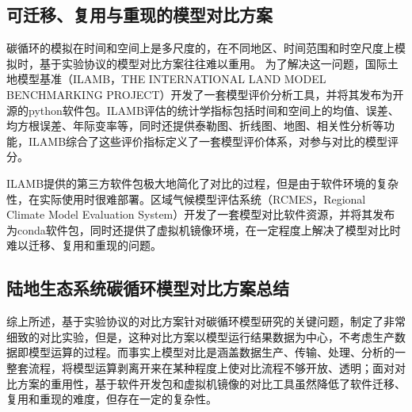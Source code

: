 \subsection{可迁移、复用与重现的模型对比方案}
碳循环的模拟在时间和空间上是多尺度的，在不同地区、时间范围和时空尺度上模拟时，基于实验协议的模型对比方案往往难以重用。
为了解决这一问题，国际土地模型基准（ILAMB，THE INTERNATIONAL LAND MODEL BENCHMARKING PROJECT）开发了一套模型评价分析工具，并将其发布为开源的python软件包。ILAMB评估的统计学指标包括时间和空间上的均值、误差、均方根误差、年际变率等，同时还提供泰勒图、折线图、地图、相关性分析等功能，ILAMB综合了这些评价指标定义了一套模型评价体系，对参与对比的模型评分。

ILAMB提供的第三方软件包极大地简化了对比的过程，但是由于软件环境的复杂性，在实际使用时很难部署。区域气候模型评估系统（RCMES，Regional Climate Model Evaluation System）开发了一套模型对比软件资源，并将其发布为conda软件包，同时还提供了虚拟机镜像环境，在一定程度上解决了模型对比时难以迁移、复用和重现的问题。

\subsection{陆地生态系统碳循环模型对比方案总结}

综上所述，基于实验协议的对比方案针对碳循环模型研究的关键问题，制定了非常细致的对比实验，但是，这种对比方案以模型运行结果数据为中心，不考虑生产数据即模型运算的过程。而事实上模型对比是涵盖数据生产、传输、处理、分析的一整套流程，将模型运算剥离开来在某种程度上使对比流程不够开放、透明；面对对比方案的重用性，基于软件开发包和虚拟机镜像的对比工具虽然降低了软件迁移、复用和重现的难度，但存在一定的复杂性。

